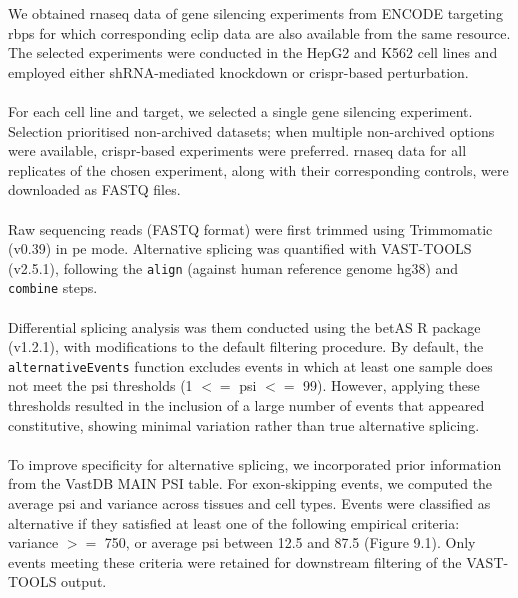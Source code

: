 We obtained \gls{rnaseq} data of gene silencing experiments from ENCODE\cite{the_encode_project_consortium_integrated_2012} targeting \glspl{rbp} for which corresponding \gls{eclip} data are also available from the same resource. The selected experiments were conducted in the HepG2 and K562 cell lines and employed either shRNA-mediated knockdown or \gls{crispr}-based perturbation.
\\
\\
For each cell line and target, we selected a single gene silencing experiment. Selection prioritised non-archived datasets; when multiple non-archived options were available, \gls{crispr}-based experiments were preferred. \gls{rnaseq} data for all replicates of the chosen experiment, along with their corresponding controls, were downloaded as FASTQ files.
\\
\\
Raw sequencing reads (FASTQ format) were first trimmed using Trimmomatic (v0.39)\cite{bolger_trimmomatic_2014} in \gls{pe} mode. Alternative splicing was quantified with VAST-TOOLS (v2.5.1)\cite{tapial_atlas_2017}, following the \texttt{align} (against human reference genome hg38) and \texttt{combine} steps.
\\
\\
Differential splicing analysis was them conducted using the betAS R package (v1.2.1)\cite{ascensao-ferreira_betas_2024}, with modifications to the default filtering procedure. By default, the \texttt{alternative\allowbreak Events} function excludes events in which at least one sample does not meet the \gls{psi} thresholds (1 $<=$ \gls{psi} $<=$ 99). However, applying these thresholds resulted in the inclusion of a large number of events that appeared constitutive, showing minimal variation rather than true alternative splicing.
\\
\\
To improve specificity for alternative splicing, we incorporated prior information from the VastDB MAIN PSI table\cite{tapial_atlas_2017}. For exon-skipping events, we computed the average \gls{psi} and variance across tissues and cell types. Events were classified as alternative if they satisfied at least one of the following empirical criteria: variance $>=$ 750, or average \gls{psi} between 12.5 and 87.5 (Figure 9.1). Only events meeting these criteria were retained for downstream filtering of the VAST-TOOLS output.

